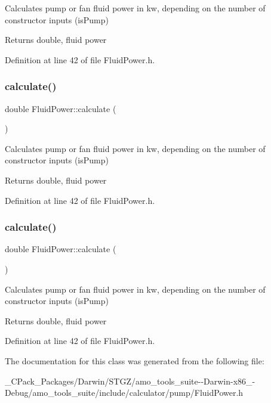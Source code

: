 Calculates pump or fan fluid power in kw, depending on the number of constructor inputs (is\+Pump) \begin{DoxyReturn}{Returns}
double, fluid power 
\end{DoxyReturn}


Definition at line 42 of file Fluid\+Power.\+h.

\mbox{\label{class_fluid_power_a2691f6efdbd5e71aa91e087c6b1c197b}} 
\subsubsection{\texorpdfstring{calculate()}{calculate()}\hspace{0.1cm}{\footnotesize\ttfamily [2/3]}}
{\footnotesize\ttfamily double Fluid\+Power\+::calculate (\begin{DoxyParamCaption}{ }\end{DoxyParamCaption})\hspace{0.3cm}{\ttfamily [inline]}}

Calculates pump or fan fluid power in kw, depending on the number of constructor inputs (is\+Pump) \begin{DoxyReturn}{Returns}
double, fluid power 
\end{DoxyReturn}


Definition at line 42 of file Fluid\+Power.\+h.

\mbox{\label{class_fluid_power_a2691f6efdbd5e71aa91e087c6b1c197b}} 
\subsubsection{\texorpdfstring{calculate()}{calculate()}\hspace{0.1cm}{\footnotesize\ttfamily [3/3]}}
{\footnotesize\ttfamily double Fluid\+Power\+::calculate (\begin{DoxyParamCaption}{ }\end{DoxyParamCaption})\hspace{0.3cm}{\ttfamily [inline]}}

Calculates pump or fan fluid power in kw, depending on the number of constructor inputs (is\+Pump) \begin{DoxyReturn}{Returns}
double, fluid power 
\end{DoxyReturn}


Definition at line 42 of file Fluid\+Power.\+h.



The documentation for this class was generated from the following file\+:\begin{DoxyCompactItemize}
\item 
\+\_\+\+C\+Pack\+\_\+\+Packages/\+Darwin/\+S\+T\+G\+Z/amo\+\_\+tools\+\_\+suite-\/-\/\+Darwin-\/x86\+\_-\/\+Debug/amo\+\_\+tools\+\_\+suite/include/calculator/pump/Fluid\+Power.\+h\end{DoxyCompactItemize}

